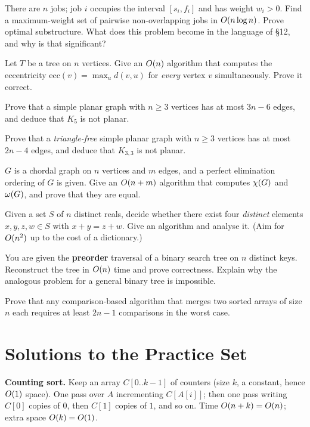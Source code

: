 There are $n$ jobs; job $i$ occupies the interval $[s_i,f_i]$ and has weight $w_i>0$. Find a
maximum-weight set of pairwise non-overlapping jobs in $O(n\log n)$. Prove optimal substructure.
What does this problem become in the language of \S12, and why is that significant?

Let $T$ be a tree on $n$ vertices. Give an $O(n)$ algorithm that computes the eccentricity
$\mathrm{ecc}(v)=\max_u d(v,u)$ for \emph{every} vertex $v$ simultaneously. Prove it correct.

 Prove that a simple planar graph with $n\ge3$ vertices has at most $3n-6$ edges, and
deduce that $K_5$ is not planar.

 Prove that a \emph{triangle-free} simple planar graph with $n\ge3$ vertices has at most
$2n-4$ edges, and deduce that $K_{3,3}$ is not planar.

$G$ is a chordal graph on $n$ vertices and $m$ edges, and a perfect elimination ordering of $G$
is given. Give an $O(n+m)$ algorithm that computes $\chi(G)$ and $\omega(G)$, and prove that
they are equal.

Given a set $S$ of $n$ distinct reals, decide whether there exist four \emph{distinct} elements
$x,y,z,w\in S$ with $x+y=z+w$. Give an algorithm and analyse it. (Aim for $O(n^2)$ up to the
cost of a dictionary.)

You are given the \textbf{preorder} traversal of a binary search tree on $n$ distinct keys.
Reconstruct the tree in $O(n)$ time and prove correctness. Explain why the analogous problem for
a general binary tree is impossible.

Prove that any comparison-based algorithm that merges two sorted arrays of size $n$ each requires
at least $2n-1$ comparisons in the worst case.

\section{Solutions to the Practice Set}\label{sec:sols}

\setcounter{pq}{0}

 \textbf{Counting sort.} Keep an array $C[0..k-1]$ of counters (size $k$, a constant, hence
$O(1)$ space). One pass over $A$ incrementing $C[A[i]]$; then one pass writing $C[0]$ copies of
$0$, then $C[1]$ copies of $1$, and so on. Time $O(n+k)=O(n)$; extra space $O(k)=O(1)$.

